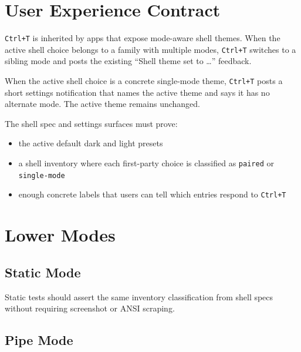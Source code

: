 \section{User Experience Contract}\label{record-183-user-experience-contract}

\texttt{C\allowbreak{}t\allowbreak{}r\allowbreak{}l\allowbreak{}+\allowbreak{}T} is inherited by apps that expose mode-aware shell themes. When the active shell choice belongs to a family with multiple modes, \texttt{C\allowbreak{}t\allowbreak{}r\allowbreak{}l\allowbreak{}+\allowbreak{}T} switches to a sibling mode and posts the existing ``Shell theme set to \ldots{}'' feedback.

When the active shell choice is a concrete single-mode theme, \texttt{C\allowbreak{}t\allowbreak{}r\allowbreak{}l\allowbreak{}+\allowbreak{}T} posts a short settings notification that names the active theme and says it has no alternate mode. The active theme remains unchanged.

The shell spec and settings surfaces must prove:

\begin{itemize}
\tightlist
\item
  the active default dark and light presets
\item
  a shell inventory where each first-party choice is classified as \texttt{p\allowbreak{}a\allowbreak{}i\allowbreak{}r\allowbreak{}e\allowbreak{}d} or \texttt{s\allowbreak{}i\allowbreak{}n\allowbreak{}g\allowbreak{}l\allowbreak{}e\allowbreak{}-\allowbreak{}m\allowbreak{}o\allowbreak{}d\allowbreak{}e}
\item
  enough concrete labels that users can tell which entries respond to \texttt{C\allowbreak{}t\allowbreak{}r\allowbreak{}l\allowbreak{}+\allowbreak{}T}
\end{itemize}

\section{Lower Modes}\label{record-183-lower-modes}

\subsection{Static Mode}\label{record-183-static-mode}

Static tests should assert the same inventory classification from shell specs without requiring screenshot or ANSI scraping.

\subsection{Pipe Mode}\label{record-183-pipe-mode}

